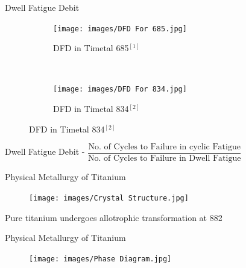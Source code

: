 \documentclass[10pt]{beamer}
\begin{document}
{%
\begin{frame}[fragile]{Dwell Fatigue Debit}

\begin{figure}[H]
    \centering
    \begin{subfigure}{0.45\textwidth}
        \texttt{[image: images/DFD For 685.jpg]}
        \caption{DFD in Timetal 685$^{[1]}$}
        \end{subfigure}
    ~
    \begin{subfigure}{0.45\textwidth}
        \texttt{[image: images/DFD For 834.jpg]}
        \caption{DFD in Timetal 834$^{[2]}$}
    \end{subfigure}   
\end{figure}

Dwell Fatigue Debit - $ \dfrac{\text{No. of Cycles to Failure in cyclic Fatigue}}{\text{No. of Cycles to Failure in Dwell Fatigue}} $  

\end{frame}
}

{%
\begin{frame}[fragile]{Physical Metallurgy of Titanium}

\begin{figure}[H]
    \centering
        \texttt{[image: images/Crystal Structure.jpg]}
\end{figure}

Pure titanium undergoes allotrophic transformation at 882 \degC

\end{frame}
}

{%

\begin{frame}[fragile]{Physical Metallurgy of Titanium}

\begin{figure}[H]
    \centering
        \texttt{[image: images/Phase Diagram.jpg]}
\end{figure}

\end{frame}
}
\end{document}
